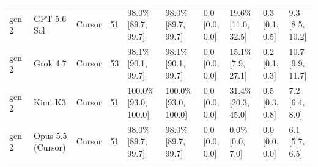 \begin{tabular}{llllllllll}
gen-2 & GPT-5.6 Sol & Cursor & 51 & 98.0\% [89.7, 99.7] & 98.0\% [89.7, 99.7] & 0.0 [0.0, 0.0] & 19.6\% [11.0, 32.5] & 0.3 [0.1, 0.5] & 9.3 [8.5, 10.2] \\
gen-2 & Grok 4.7 & Cursor & 53 & 98.1\% [90.1, 99.7] & 98.1\% [90.1, 99.7] & 0.0 [0.0, 0.0] & 15.1\% [7.9, 27.1] & 0.2 [0.1, 0.3] & 10.7 [9.9, 11.7] \\
gen-2 & Kimi K3 & Cursor & 51 & 100.0\% [93.0, 100.0] & 100.0\% [93.0, 100.0] & 0.0 [0.0, 0.0] & 31.4\% [20.3, 45.0] & 0.5 [0.3, 0.8] & 7.2 [6.4, 8.0] \\
gen-2 & Opus 5.5 (Cursor) & Cursor & 51 & 98.0\% [89.7, 99.7] & 98.0\% [89.7, 99.7] & 0.0 [0.0, 0.0] & 0.0\% [0.0, 7.0] & 0.0 [0.0, 0.0] & 6.1 [5.7, 6.5] \\
\bottomrule
\end{tabular}
